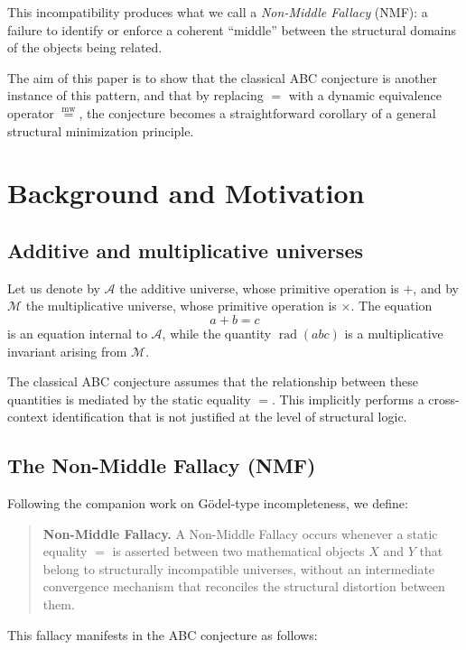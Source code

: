 \documentclass[11pt]{article}
\newcommand{\mweq}{\mathrel{\overset{\mathrm{mw}}{=}}}
\theoremstyle{definition}
\theoremstyle{remark}
\begin{document}
This incompatibility produces what we call a {\em Non-Middle Fallacy}
(NMF): a failure to identify or enforce a coherent ``middle'' between
the structural domains of the objects being related.

The aim of this paper is to show that the classical ABC conjecture is
another instance of this pattern, and that by replacing $=$ with a
dynamic equivalence operator $\mweq$, the conjecture becomes a
straightforward corollary of a general structural minimization
principle.

\section{Background and Motivation}

\subsection{Additive and multiplicative universes}

Let us denote by $\mathcal{A}$ the additive universe, whose primitive
operation is $+$, and by $\mathcal{M}$ the multiplicative universe,
whose primitive operation is $\times$. The equation
\[
  a + b = c
\]
is an equation internal to $\mathcal{A}$, while the quantity
$\operatorname{rad}(abc)$ is a multiplicative invariant arising from
$\mathcal{M}$.

The classical ABC conjecture assumes that the relationship between these
quantities is mediated by the static equality $=$. This implicitly
performs a cross-context identification that is not justified at the
level of structural logic.

\subsection{The Non-Middle Fallacy (NMF)}

Following the companion work on G\"odel-type incompleteness, we define:

\begin{quote}
{\bf Non-Middle Fallacy.}
A Non-Middle Fallacy occurs whenever a static equality $=$ is asserted
between two mathematical objects $X$ and $Y$ that belong to structurally
incompatible universes, without an intermediate convergence mechanism
that reconciles the structural distortion between them.
\end{quote}

This fallacy manifests in the ABC conjecture as follows:
\end{document}

